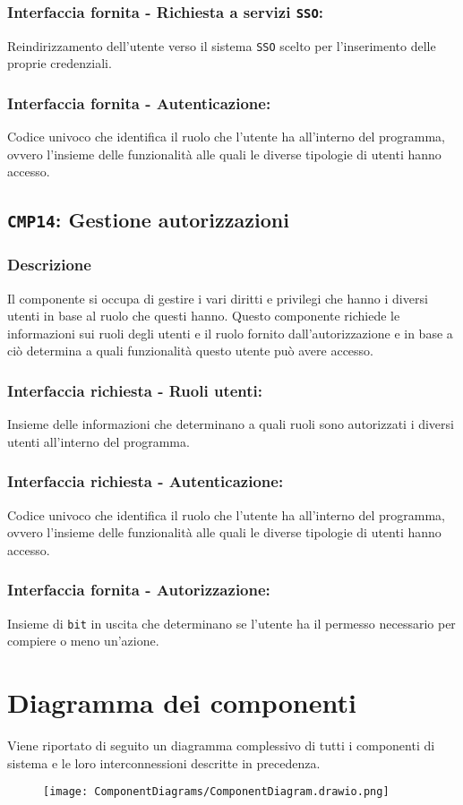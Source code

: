         \subsubsection{Interfaccia fornita - Richiesta a servizi \texttt{SSO}:}
            Reindirizzamento dell'utente verso il sistema \texttt{SSO} scelto per l'inserimento delle proprie credenziali.
        \subsubsection{Interfaccia fornita - Autenticazione:}
            Codice univoco che identifica il ruolo che l'utente ha all'interno del programma, ovvero l'insieme delle funzionalità alle quali le diverse tipologie di utenti hanno accesso.
    
    \subsection{\texttt{CMP14}: Gestione autorizzazioni}
        \subsubsection{Descrizione}
            Il componente si occupa di gestire i vari diritti e privilegi che hanno i diversi utenti in base al ruolo che questi hanno. Questo componente richiede le informazioni sui ruoli degli utenti e il ruolo fornito dall'autorizzazione e in base a ciò determina a quali funzionalità questo utente può avere accesso. 
        \subsubsection{Interfaccia richiesta - Ruoli utenti:}
            Insieme delle informazioni che determinano a quali ruoli sono autorizzati i diversi utenti all'interno del programma.
        \subsubsection{Interfaccia richiesta - Autenticazione:}
            Codice univoco che identifica il ruolo che l'utente ha all'interno del programma, ovvero l'insieme delle funzionalità alle quali le diverse tipologie di utenti hanno accesso.
        \subsubsection{Interfaccia fornita - Autorizzazione:}
            Insieme di \texttt{bit} in uscita che determinano se l'utente ha il permesso necessario per compiere o meno un'azione.

\newpage
\section{Diagramma dei componenti}
    Viene riportato di seguito un diagramma complessivo di tutti i componenti di sistema e le loro interconnessioni descritte in precedenza.
    \begin{figure}[H]
        \centering
        \texttt{[image: ComponentDiagrams/ComponentDiagram.drawio.png]}
    \end{figure}